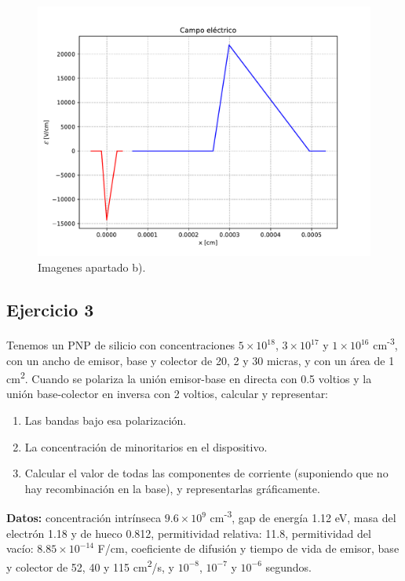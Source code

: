 \begin{enumerate}[label=\alph*)]
\begin{figure}[h!]
        \includegraphics[width=0.48\linewidth]{Cuerpo/Ch_04/04_Ejercicio-2-04.pdf}
        \caption{Imagenes apartado b).}
    \end{figure}

\end{enumerate}
\vspace*{2em}


\begin{Enunciado}
\subsection*{Ejercicio 3} 
Tenemos un PNP de silicio con concentraciones $5 \times 10^{18}$, $3 \times 10^{17}$ y $1 \times 10^{16}$ cm\textsuperscript{-3}, con un ancho de emisor, base y colector de 20, 2 y 30 micras, y con un área de 1 cm\textsuperscript{2}. Cuando se polariza la unión emisor-base en directa con 0.5 voltios y la unión base-colector en inversa con 2 voltios, calcular y representar:
\begin{enumerate}[label=\alph*)]
    \item Las bandas bajo esa polarización.
    \item La concentración de minoritarios en el dispositivo.
    \item Calcular el valor de todas las componentes de corriente (suponiendo que no hay recombinación en la base), y representarlas gráficamente.
\end{enumerate}
\textbf{Datos:} concentración intrínseca $9.6 \times 10^9$ cm\textsuperscript{-3}, gap de energía 1.12 eV, masa del electrón 1.18 y de hueco 0.812, permitividad relativa: 11.8, permitividad del vacío: $8.85 \times 10^{-14}$ F/cm, coeficiente de difusión y tiempo de vida de emisor, base y colector de 52, 40 y 115 cm\textsuperscript{2}/s, y $10^{-8}$, $10^{-7}$ y $10^{-6}$ segundos.
\end{Enunciado}

\vspace*{1em}

